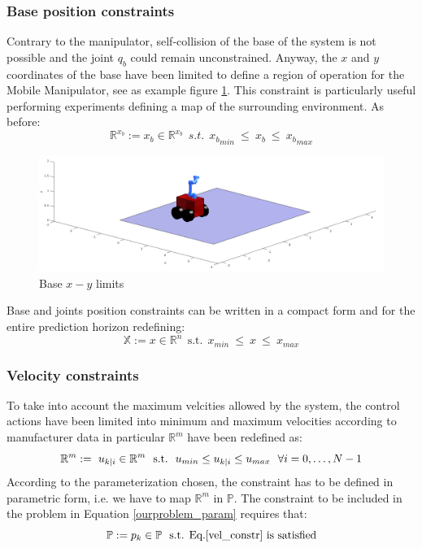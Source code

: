 \subsubsection*{Base position constraints}
	Contrary to the manipulator, self-collision of the base of the system is not possible and the joint $q_b$ could remain unconstrained. Anyway, the $x$ and $y$ coordinates of the base have been limited to define a region of operation for the Mobile Manipulator, see as example figure \ref{xy_limits}. This constraint is particularly useful performing experiments defining a map of the surrounding environment. As before: 
	\begin{equation}
		\mathbb{R}^{x_b}:=x_b \in \mathbb{R}^{x_b}\ \ s.t.\ \  {x_b}_{min}\ \leq\ x_b\ \leq\ {x_b}_{max} 
	\end{equation}

	\begin{figure}[h!]
	\centering
	\includegraphics[scale=0.25]{IMMAGINI/xy_limits.png}
	\caption{Base $x-y$ limits}
	\label{xy_limits}
	\end{figure}

	Base and joints position constraints can be written in a compact form and for the entire prediction horizon redefining: 
	\begin{equation}
	\mathbb{X}:= x \in \mathbb{R}^{n}\ \ \text{s.t.}\ \  {x}_{min}\ \leq\ x\ \leq\ {x}_{max}
	\end{equation}

\subsubsection*{Velocity constraints}
	To take into account the maximum velcities allowed by the system, the control actions have been limited into minimum and maximum velocities according to manufacturer data in particular $\mathbb{R}^m$ have been redefined as:
	\begin{equation}
	\mathbb{R}^m:=\ {u}_{k|i} \in \mathbb{R}^m\ \ \textnormal{s.t.}\ \ u_{min}\leq{u_{k|i}}\leq u_{max}\ \ \forall i=0,\dots, N-1
	\label{vel_constr}
	\end{equation}
	According to the parameterization chosen, the constraint has to be defined in parametric form, i.e. we have to map $\mathbb{R}^m$ in $\mathbb{P}$. The constraint to be included in the problem in Equation \ref{ourproblem_param} requires that:
	\begin{equation*}
		\mathbb{P}:=p_k \in \mathbb{P}\ \textnormal{ s.t. Eq.\ref{vel_constr} is satisfied}
	\end{equation*}


